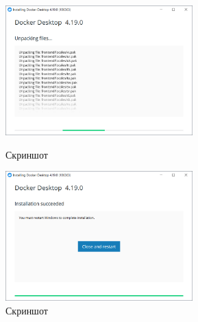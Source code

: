 \begin{figure}[!phtb]
    \centering

    \begin{minipage}{0.49\textwidth}
        \centering

        \includegraphics[height=5cm]
        {images/install/docker/3.png}

        \caption{Скриншот}

        \label{fig:docker_3}
    \end{minipage}
    \begin{minipage}{0.49\textwidth}
        \centering

        \includegraphics[height=5cm]
        {images/install/docker/4.png}

        \caption{Скриншот}

        \label{fig:docker_4}
    \end{minipage}
\end{figure}

